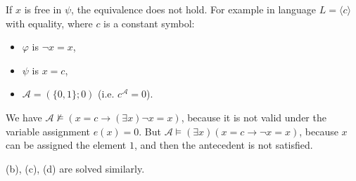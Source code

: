 \begin{problem}
\begin{solution}
            If $x$ is free in $\psi$, the equivalence does not hold. For example in language $L=\langle c\rangle$ with equality, where $c$ is a constant symbol:
            \begin{itemize}
                \item $\varphi$ is $\neg x=x$,
                \item $\psi$ is $x=c$,
                \item $\mathcal A=(\{0,1\};0)$ (i.e. $c^\mathcal A=0$).
            \end{itemize}
            We have $\mathcal A\not\models (x=c\to (\exists x) \neg x=x)$, because it is not valid under the variable assignment $e(x)=0$. But $\mathcal A\models(\exists x)(x=c\to \neg x=x)$, because $x$ can be assigned the element $1$, and then the antecedent is not satisfied.

        (b), (c), (d) are solved similarly. 
                    
    \end{solution}

\end{problem}


